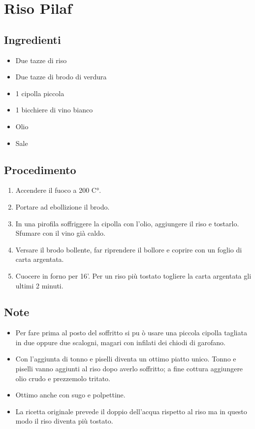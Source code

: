 \section{Riso Pilaf}
\subsection{Ingredienti}
\begin{itemize}
\item Due tazze di riso  
\item Due tazze di brodo di verdura  
\item 1 cipolla piccola  
\item 1 bicchiere di vino bianco  
\item Olio  
\item Sale
\end{itemize}
\subsection{Procedimento}
\begin{enumerate}
\item  Accendere il fuoco a 200 C°.  
\item  Portare ad ebollizione il brodo.  
\item  In una pirofila soffriggere la cipolla con l'olio, aggiungere il riso e tostarlo. Sfumare con il vino già caldo.  
\item  Versare il brodo bollente, far riprendere il bollore e coprire con un foglio di carta argentata.  
\item  Cuocere in forno per 16'. Per un riso più tostato togliere la carta argentata gli ultimi 2 minuti.
\end{enumerate}
\subsection{Note}
\begin{itemize}
\item Per fare prima al posto del soffritto si pu ò usare una piccola cipolla tagliata in due oppure due scalogni, magari con infilati dei chiodi di garofano.  
\item Con l'aggiunta di tonno e piselli diventa un ottimo piatto unico. Tonno e piselli vanno aggiunti al riso dopo averlo soffritto; a fine cottura aggiungere olio crudo e prezzemolo tritato.  
\item Ottimo anche con sugo e polpettine.  
\item La ricetta originale prevede il doppio dell'acqua rispetto al riso ma in questo modo il riso diventa più tostato.
\end{itemize}
